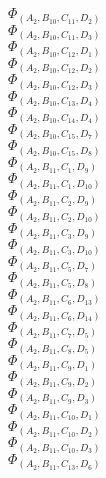 \documentclass[14pt]{article}
\begin{document}
    $\Phi_{({A}_{2}, {B}_{10}, {C}_{11}, {D}_{2})}$ \\ 
    $\Phi_{({A}_{2}, {B}_{10}, {C}_{11}, {D}_{3})}$ \\ 
    $\Phi_{({A}_{2}, {B}_{10}, {C}_{12}, {D}_{1})}$ \\ 
    $\Phi_{({A}_{2}, {B}_{10}, {C}_{12}, {D}_{2})}$ \\ 
    $\Phi_{({A}_{2}, {B}_{10}, {C}_{12}, {D}_{3})}$ \\ 
    $\Phi_{({A}_{2}, {B}_{10}, {C}_{13}, {D}_{4})}$ \\ 
    $\Phi_{({A}_{2}, {B}_{10}, {C}_{14}, {D}_{4})}$ \\ 
    $\Phi_{({A}_{2}, {B}_{10}, {C}_{15}, {D}_{7})}$ \\ 
    $\Phi_{({A}_{2}, {B}_{10}, {C}_{15}, {D}_{8})}$ \\ 
    $\Phi_{({A}_{2}, {B}_{11}, {C}_{1}, {D}_{9})}$ \\ 
    $\Phi_{({A}_{2}, {B}_{11}, {C}_{1}, {D}_{10})}$ \\ 
    $\Phi_{({A}_{2}, {B}_{11}, {C}_{2}, {D}_{9})}$ \\ 
    $\Phi_{({A}_{2}, {B}_{11}, {C}_{2}, {D}_{10})}$ \\ 
    $\Phi_{({A}_{2}, {B}_{11}, {C}_{3}, {D}_{9})}$ \\ 
    $\Phi_{({A}_{2}, {B}_{11}, {C}_{3}, {D}_{10})}$ \\ 
    $\Phi_{({A}_{2}, {B}_{11}, {C}_{5}, {D}_{7})}$ \\ 
    $\Phi_{({A}_{2}, {B}_{11}, {C}_{5}, {D}_{8})}$ \\ 
    $\Phi_{({A}_{2}, {B}_{11}, {C}_{6}, {D}_{13})}$ \\ 
    $\Phi_{({A}_{2}, {B}_{11}, {C}_{6}, {D}_{14})}$ \\ 
    $\Phi_{({A}_{2}, {B}_{11}, {C}_{7}, {D}_{5})}$ \\ 
    $\Phi_{({A}_{2}, {B}_{11}, {C}_{8}, {D}_{5})}$ \\ 
    $\Phi_{({A}_{2}, {B}_{11}, {C}_{9}, {D}_{1})}$ \\ 
    $\Phi_{({A}_{2}, {B}_{11}, {C}_{9}, {D}_{2})}$ \\ 
    $\Phi_{({A}_{2}, {B}_{11}, {C}_{9}, {D}_{3})}$ \\ 
    $\Phi_{({A}_{2}, {B}_{11}, {C}_{10}, {D}_{1})}$ \\ 
    $\Phi_{({A}_{2}, {B}_{11}, {C}_{10}, {D}_{2})}$ \\ 
    $\Phi_{({A}_{2}, {B}_{11}, {C}_{10}, {D}_{3})}$ \\ 
    $\Phi_{({A}_{2}, {B}_{11}, {C}_{13}, {D}_{6})}$ \\ 
\end{document}
